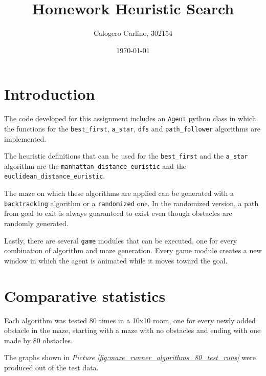 \documentclass[10pt, letterpaper]{article}
\title{Homework Heuristic Search}
\author{Calogero Carlino, 302154}
\date{\today}
\begin{document}
\maketitle

\section{Introduction}
The code developed for this assignment includes an \texttt{Agent} python 
class in which the functions for the 
\texttt{best\_first}, \texttt{a\_star}, \texttt{dfs} and 
\texttt{path\_follower} algorithms are implemented.

The heuristic definitions that can be used for the 
\texttt{best\_first} and the \texttt{a\_star} algorithm are the 
\texttt{manhattan\_distance\_euristic} and the 
\texttt{euclidean\_distance\_euristic}.

The maze on which these algorithms are applied can be generated with
a \texttt{backtracking} algorithm or a \texttt{randomized} one. In the 
randomized version, a path from goal to exit is always guaranteed
to exist even though obstacles are randomly generated.

Lastly, there are several \texttt{game} modules that can be executed, one
for every combination of algorithm and maze generation. Every game module
creates a new window in which the agent is animated while it moves toward
the goal.

\section{Comparative statistics}
Each algorithm was tested 80 times in a 10x10 room, one for every 
newly added obstacle in the maze, starting with a maze with no obstacles 
and ending with one made by 80 obstacles.

The graphs shown in \emph{Picture \ref{fig:maze_runner_algorithms_80_test_runs}} were produced out of the test data.
\end{document}
